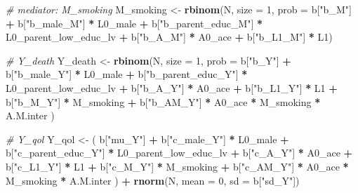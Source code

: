 \documentclass[
]{book}
\newenvironment{Shaded}{\begin{snugshade}}{\end{snugshade}}
\newcommand{\AttributeTok}[1]{\textcolor[rgb]{0.13,0.29,0.53}{#1}}
\newcommand{\CommentTok}[1]{\textcolor[rgb]{0.56,0.35,0.01}{\textit{#1}}}
\newcommand{\DecValTok}[1]{\textcolor[rgb]{0.00,0.00,0.81}{#1}}
\newcommand{\FunctionTok}[1]{\textcolor[rgb]{0.13,0.29,0.53}{\textbf{#1}}}
\newcommand{\NormalTok}[1]{#1}
\newcommand{\OtherTok}[1]{\textcolor[rgb]{0.56,0.35,0.01}{#1}}
\newcommand{\SpecialCharTok}[1]{\textcolor[rgb]{0.81,0.36,0.00}{\textbf{#1}}}
\newcommand{\StringTok}[1]{\textcolor[rgb]{0.31,0.60,0.02}{#1}}
\begin{document}
\begin{Shaded}
\begin{Highlighting}[]
  \CommentTok{\# mediator: M\_smoking}
\NormalTok{  M\_smoking }\OtherTok{\textless{}{-}} \FunctionTok{rbinom}\NormalTok{(N, }\AttributeTok{size =} \DecValTok{1}\NormalTok{, }\AttributeTok{prob =}\NormalTok{ b[}\StringTok{"b\_M"}\NormalTok{] }\SpecialCharTok{+} 
\NormalTok{                        b[}\StringTok{"b\_male\_M"}\NormalTok{] }\SpecialCharTok{*}\NormalTok{ L0\_male }\SpecialCharTok{+} 
\NormalTok{                        b[}\StringTok{"b\_parent\_educ\_M"}\NormalTok{] }\SpecialCharTok{*}\NormalTok{ L0\_parent\_low\_educ\_lv }\SpecialCharTok{+} 
\NormalTok{                        b[}\StringTok{"b\_A\_M"}\NormalTok{] }\SpecialCharTok{*}\NormalTok{ A0\_ace }\SpecialCharTok{+}
\NormalTok{                        b[}\StringTok{"b\_L1\_M"}\NormalTok{] }\SpecialCharTok{*}\NormalTok{ L1) }

  \CommentTok{\# Y\_death }
\NormalTok{  Y\_death }\OtherTok{\textless{}{-}} \FunctionTok{rbinom}\NormalTok{(N, }\AttributeTok{size =} \DecValTok{1}\NormalTok{, }\AttributeTok{prob =}\NormalTok{ b[}\StringTok{"b\_Y"}\NormalTok{] }\SpecialCharTok{+} 
\NormalTok{                      b[}\StringTok{"b\_male\_Y"}\NormalTok{] }\SpecialCharTok{*}\NormalTok{ L0\_male }\SpecialCharTok{+} 
\NormalTok{                      b[}\StringTok{"b\_parent\_educ\_Y"}\NormalTok{] }\SpecialCharTok{*}\NormalTok{ L0\_parent\_low\_educ\_lv }\SpecialCharTok{+} 
\NormalTok{                      b[}\StringTok{"b\_A\_Y"}\NormalTok{] }\SpecialCharTok{*}\NormalTok{ A0\_ace }\SpecialCharTok{+} 
\NormalTok{                      b[}\StringTok{"b\_L1\_Y"}\NormalTok{] }\SpecialCharTok{*}\NormalTok{ L1 }\SpecialCharTok{+}
\NormalTok{                      b[}\StringTok{"b\_M\_Y"}\NormalTok{] }\SpecialCharTok{*}\NormalTok{ M\_smoking }\SpecialCharTok{+}
\NormalTok{                      b[}\StringTok{"b\_AM\_Y"}\NormalTok{] }\SpecialCharTok{*}\NormalTok{ A0\_ace }\SpecialCharTok{*}\NormalTok{ M\_smoking }\SpecialCharTok{*}\NormalTok{ A.M.inter ) }
  
  \CommentTok{\# Y\_qol }
\NormalTok{  Y\_qol }\OtherTok{\textless{}{-}}\NormalTok{ ( b[}\StringTok{"mu\_Y"}\NormalTok{] }\SpecialCharTok{+} 
\NormalTok{               b[}\StringTok{"c\_male\_Y"}\NormalTok{] }\SpecialCharTok{*}\NormalTok{ L0\_male }\SpecialCharTok{+} 
\NormalTok{               b[}\StringTok{"c\_parent\_educ\_Y"}\NormalTok{] }\SpecialCharTok{*}\NormalTok{ L0\_parent\_low\_educ\_lv }\SpecialCharTok{+}
\NormalTok{               b[}\StringTok{"c\_A\_Y"}\NormalTok{] }\SpecialCharTok{*}\NormalTok{ A0\_ace }\SpecialCharTok{+}
\NormalTok{               b[}\StringTok{"c\_L1\_Y"}\NormalTok{] }\SpecialCharTok{*}\NormalTok{ L1 }\SpecialCharTok{+}
\NormalTok{               b[}\StringTok{"c\_M\_Y"}\NormalTok{] }\SpecialCharTok{*}\NormalTok{ M\_smoking }\SpecialCharTok{+} 
\NormalTok{               b[}\StringTok{"c\_AM\_Y"}\NormalTok{] }\SpecialCharTok{*}\NormalTok{ A0\_ace }\SpecialCharTok{*}\NormalTok{ M\_smoking }\SpecialCharTok{*}\NormalTok{ A.M.inter ) }\SpecialCharTok{+} 
    \FunctionTok{rnorm}\NormalTok{(N, }\AttributeTok{mean =} \DecValTok{0}\NormalTok{, }\AttributeTok{sd =}\NormalTok{ b[}\StringTok{"sd\_Y"}\NormalTok{])}
  

\end{Highlighting}
\end{Shaded}
\end{document}
